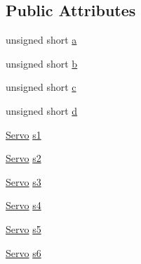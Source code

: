 \subsection*{Public Attributes}
\begin{DoxyCompactItemize}
\item 
unsigned short \hyperlink{class_robotic_arm_aaf0461b1cb35da93d2e446f50b9813a4}{a}
\item 
unsigned short \hyperlink{class_robotic_arm_a2758a63b85f492abda0e84f32fbfdd98}{b}
\item 
unsigned short \hyperlink{class_robotic_arm_a5f6cae6b67db69c97b75970dacc72ea8}{c}
\item 
unsigned short \hyperlink{class_robotic_arm_ada1f488e8627fcb18d4b15b70c593be8}{d}
\item 
\hyperlink{struct_servo}{Servo} \hyperlink{class_robotic_arm_a405680ac32df6d444683b997b785623f}{s1}
\item 
\hyperlink{struct_servo}{Servo} \hyperlink{class_robotic_arm_aeafd57f690026379493f193d94bd8210}{s2}
\item 
\hyperlink{struct_servo}{Servo} \hyperlink{class_robotic_arm_a9241e65a54080f2f642bd08a78a12f6f}{s3}
\item 
\hyperlink{struct_servo}{Servo} \hyperlink{class_robotic_arm_af0d9eb18ff10b252b79c8a986fe31170}{s4}
\item 
\hyperlink{struct_servo}{Servo} \hyperlink{class_robotic_arm_a393711dcc74eb1fba3f9e544cd2bb771}{s5}
\item 
\hyperlink{struct_servo}{Servo} \hyperlink{class_robotic_arm_a4816473ed62d262e2a29590769e82f10}{s6}
\end{DoxyCompactItemize}

